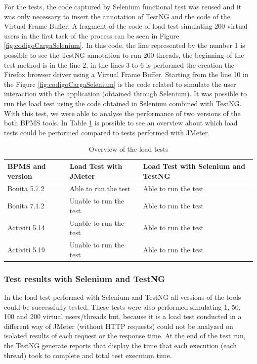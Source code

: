 \documentclass[runningheads,a4paper]{llncs}
\begin{document}
For the tests, the code captured by Selenium functional test was reused and it was only necessary to insert the annotation of TestNG and the code of the Virtual Frame Buffer. A fragment of the code of load test simulating 200 virtual users in the first task of the process can be seen in Figure \ref{fig:codigoCargaSelenium}. In this code, the line represented by the number 1 is possible to see the TestNG annotation to run 200 threads, the beginning of the test method is in the line 2, in the lines 3 to 6 is performed the creation the Firefox browser driver using a Virtual Frame Buffer. Starting from the line 10 in the Figure \ref{fig:codigoCargaSelenium} is the code related to simulate the user interaction with the application (obtained through Selenium). It was possible to run the load test using the code obtained in Selenium combined with TestNG. With this test, we were able to analyse the performance of two versions of the both BPMS tools. In Table \ref{tab:foiPossivelCarga} is possible to see an overview about which load tests could be performed compared to tests performed with JMeter. 

\begin{table}
\centering
\begin{tabular}{p{3cm}|p{3cm}|p{3cm}}
\hline
BPMS and version & Load Test with JMeter & Load Test with Selenium and TestNG \\\hline
Bonita 5.7.2 & Able to run the test & Able to run the test \\\hline
Bonita 7.1.2 & Unable to run the test & Able to run the test \\\hline
Activiti 5.14 & Unable to run the test & Able to run the test \\\hline
Activiti 5.19 & Unable to run the test & Able to run the test \\\hline
\end{tabular}
\caption{Overview of the load tests}
\label{tab:foiPossivelCarga}
\end{table}

\subsubsection{Test results with Selenium and TestNG}
In the load test performed with Selenium and TestNG all versions of the tools could be successfully tested. These tests were also performed simulating 1, 50, 100 and 200 virtual users/threads but, because it is a load test conducted in a different way of JMeter (without HTTP requests) could not be analyzed on isolated results of each request or the response time. At the end of the test run, the TestNG generate reports that display the time that each execution (each thread) took to complete and total test execution time. 
\end{document}
